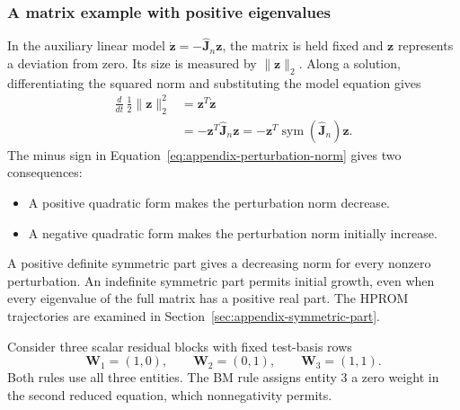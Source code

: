 \documentclass[a4paper,12pt]{article}
\newcommand{\vect}[1]{\boldsymbol{#1}}
\newcommand{\matr}[1]{\boldsymbol{#1}}
\begin{document}
\subsubsection{A matrix example with positive eigenvalues}
\label{sec:appendix-symmetric-part-example}

In the auxiliary linear model $\dot{\vect{z}}=-\widehat{\matr{J}}_n\vect{z}$, the matrix is held fixed and $\vect{z}$ represents a deviation from zero. Its size is measured by $\|\vect{z}\|_2$. Along a solution, differentiating the squared norm and substituting the model equation gives
\begin{equation}
 \begin{aligned}
 \frac{d}{dt}\,\frac12\|\vect{z}\|_2^2
 &=\vect{z}^T\dot{\vect{z}}\\
 &=-\vect{z}^T\widehat{\matr{J}}_n\vect{z}
  =-\vect{z}^T\operatorname{sym}(\widehat{\matr{J}}_n)\vect{z}.
 \end{aligned}
 \label{eq:appendix-perturbation-norm}
\end{equation}
The minus sign in Equation~\eqref{eq:appendix-perturbation-norm} gives two consequences:
\begin{itemize}
 \item A positive quadratic form makes the perturbation norm decrease.
 \item A negative quadratic form makes the perturbation norm initially increase.
\end{itemize}
A positive definite symmetric part gives a decreasing norm for every nonzero perturbation. An indefinite symmetric part permits initial growth, even when every eigenvalue of the full matrix has a positive real part. The HPROM trajectories are examined in Section~\ref{sec:appendix-symmetric-part}.

Consider three scalar residual blocks with fixed test-basis rows
\[
 \matr{W}_1=(1,0),\qquad
 \matr{W}_2=(0,1),\qquad
 \matr{W}_3=(1,1).
\]
Both rules use all three entities. The BM rule assigns entity 3 a zero weight in the second reduced equation, which nonnegativity permits.
\end{document}
